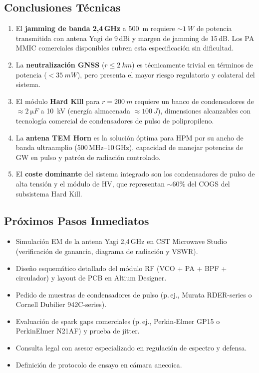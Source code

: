 \documentclass[12pt,a4paper]{article}
\begin{document}
\subsection*{Conclusiones Técnicas}

\begin{enumerate}[itemsep=4pt]
  \item El \textbf{jamming de banda 2,4\,GHz} a \SI{500}{m} requiere
        $\sim\SI{1}{W}$ de potencia transmitida con antena Yagi de 9\,dBi
        y margen de jamming de 15\,dB. Los PA MMIC comerciales disponibles
        cubren esta especificación sin dificultad.

  \item La \textbf{neutralización GNSS} ($r \leq \SI{2}{km}$) es técnicamente
        trivial en términos de potencia ($< \SI{35}{mW}$), pero presenta el
        mayor riesgo regulatorio y colateral del sistema.

  \item El módulo \textbf{Hard Kill} para $r = \SI{200}{m}$ requiere un banco
        de condensadores de $\approx \SI{2}{\micro F}$ a \SI{10}{kV}
        (energía almacenada $\approx \SI{100}{J}$), dimensiones alcanzables
        con tecnología comercial de condensadores de pulso de polipropileno.

  \item La \textbf{antena TEM Horn} es la solución óptima para HPM por su
        ancho de banda ultraamplio (500\,MHz–10\,GHz), capacidad de
        manejar potencias de GW en pulso y patrón de radiación controlado.

  \item El \textbf{coste dominante} del sistema integrado son los
        condensadores de pulso de alta tensión y el módulo de HV, que
        representan $\sim 60\%$ del COGS del subsistema Hard Kill.
\end{enumerate}

\subsection*{Próximos Pasos Inmediatos}

\begin{itemize}[itemsep=3pt]
  \item[$\square$] Simulación EM de la antena Yagi 2,4\,GHz en CST Microwave Studio
        (verificación de ganancia, diagrama de radiación y VSWR).
  \item[$\square$] Diseño esquemático detallado del módulo RF
        (VCO + PA + BPF + circulador) y layout de PCB en Altium Designer.
  \item[$\square$] Pedido de muestras de condensadores de pulso
        (p.\,ej., Murata RDER-series o Cornell Dubilier 942C-series).
  \item[$\square$] Evaluación de spark gaps comerciales (p.\,ej., Perkin-Elmer
        GP15 o PerkinElmer N21AF) y prueba de jitter.
  \item[$\square$] Consulta legal con asesor especializado en regulación
        de espectro y defensa.
  \item[$\square$] Definición de protocolo de ensayo en cámara anecoica.
\end{itemize}
\end{document}
